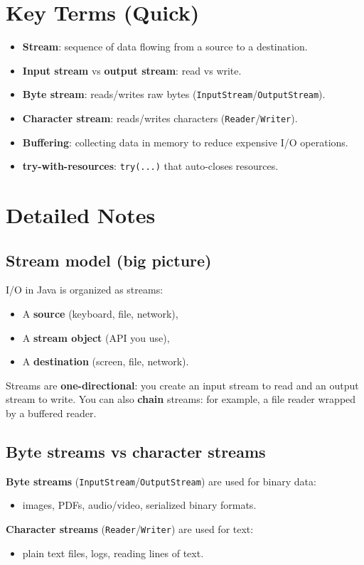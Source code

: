 \documentclass[11pt]{article}
\begin{document}
\section{Key Terms (Quick)}
\begin{itemize}
  \item \textbf{Stream}: sequence of data flowing from a source to a destination.
  \item \textbf{Input stream} vs \textbf{output stream}: read vs write.
  \item \textbf{Byte stream}: reads/writes raw bytes (\texttt{InputStream}/\texttt{OutputStream}).
  \item \textbf{Character stream}: reads/writes characters (\texttt{Reader}/\texttt{Writer}).
  \item \textbf{Buffering}: collecting data in memory to reduce expensive I/O operations.
  \item \textbf{try-with-resources}: \texttt{try(...)} that auto-closes resources.
\end{itemize}

\section{Detailed Notes}
\subsection{Stream model (big picture)}
I/O in Java is organized as streams:
\begin{itemize}
  \item A \textbf{source} (keyboard, file, network),
  \item A \textbf{stream object} (API you use),
  \item A \textbf{destination} (screen, file, network).
\end{itemize}
Streams are \textbf{one-directional}: you create an input stream to read and an output stream to write.
You can also \textbf{chain} streams: for example, a file reader wrapped by a buffered reader.

\subsection{Byte streams vs character streams}
\textbf{Byte streams} (\texttt{InputStream}/\texttt{OutputStream}) are used for binary data:
\begin{itemize}
  \item images, PDFs, audio/video, serialized binary formats.
\end{itemize}
\textbf{Character streams} (\texttt{Reader}/\texttt{Writer}) are used for text:
\begin{itemize}
  \item plain text files, logs, reading lines of text.
\end{itemize}
\end{document}
